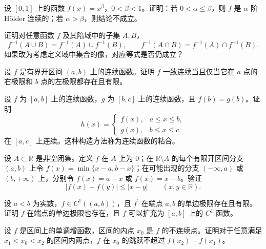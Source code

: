 \noindent\begin{minipage}{\textwidth}
设 $[0,1]$ 上的函数 $f(x)=x^\beta$，$0<\beta<1$。证明：若 $0<\alpha\le\beta$，则 $f$ 是 $\alpha$ 阶 H\"older 连续的；若 $\alpha>\beta$，则结论不成立。
\end{minipage}\par\vfill
\noindent\begin{minipage}{\textwidth}
证明对任意函数 $f$ 及其陪域中的子集 $A,B$，\[f^{-1}(A\cup B)=f^{-1}(A)\cup f^{-1}(B),\qquad f^{-1}(A\cap B)=f^{-1}(A)\cap f^{-1}(B).\]如果改为考虑定义域中集合的像，对应等式是否仍成立？
\end{minipage}\par\vfill
\newpage
\noindent\begin{minipage}{\textwidth}
设 $f$ 是有界开区间 $(a,b)$ 上的连续函数。证明 $f$ 一致连续当且仅当它在 $a$ 点的右极限和 $b$ 点的左极限都存在且有限。
\end{minipage}\par\vfill
\noindent\begin{minipage}{\textwidth}
设 $f$ 为 $[a,b]$ 上的连续函数，$g$ 为 $[b,c]$ 上的连续函数，且 $f(b)=g(b)$。证明\[h(x)=\begin{cases}f(x),&a\le x\le b,\\g(x),&b\le x\le c\end{cases}\]在 $[a,c]$ 上连续。这种构造方法称为连续函数的粘合。
\end{minipage}\par\vfill
\noindent\begin{minipage}{\textwidth}
设 $A\subset\mathbb R$ 是非空闭集。定义 $f$ 在 $A$ 上为 $0$；在 $\mathbb R\setminus A$ 的每个有限开区间分支 $(a,b)$ 上令 $f(x)=\min\{x-a,b-x\}$；在可能出现的分支 $(-\infty,a)$ 或 $(b,+\infty)$ 上，分别令 $f(x)=a-x$ 或 $f(x)=x-b$。验证\[|f(x)-f(y)|\le|x-y|\qquad(x,y\in\mathbb R).\]
\end{minipage}\par\vfill
\noindent\begin{minipage}{\textwidth}
设 $a<b$ 为实数，$f\in C^1((a,b))$，且 $f^{\prime}$ 在端点 $a,b$ 的单边极限存在且有限。证明 $f$ 在端点的单边极限也存在，且 $f$ 可以扩充为 $[a,b]$ 上的 $C^1$ 函数。
\end{minipage}\par\vfill
\newpage
\noindent\begin{minipage}{\textwidth}
设 $f$ 是区间上的单调增函数，区间的内点 $x_0$ 是 $f$ 的不连续点。证明对于任意满足 $x_1<x_0<x_2$ 的区间内两点，$f$ 在 $x_0$ 的跳跃不超过 $f(x_2)-f(x_1)$。
\end{minipage}\par\vfill
